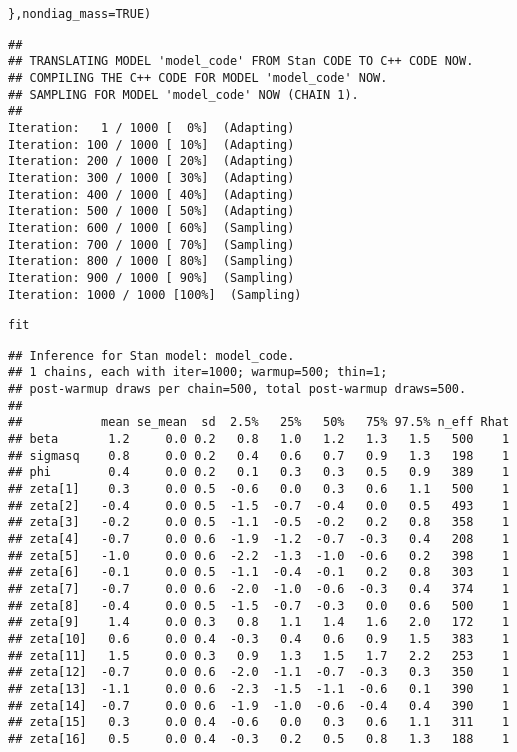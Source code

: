 \documentclass{article}\usepackage[]{graphicx}\usepackage[]{color}
\makeatletter
\newcommand{\hlnum}[1]{\textcolor[rgb]{0.686,0.059,0.569}{#1}}%
\newcommand{\hlstd}[1]{\textcolor[rgb]{0.345,0.345,0.345}{#1}}%
\newcommand{\hlkwc}[1]{\textcolor[rgb]{0.333,0.667,0.333}{#1}}%
\newenvironment{kframe}{%
 \def\at@end@of@kframe{}%
 \ifinner\ifhmode%
  \def\at@end@of@kframe{\end{minipage}}%
  \begin{minipage}{\columnwidth}%
 \fi\fi%
 \def\FrameCommand##1{\hskip\@totalleftmargin \hskip-\fboxsep
 \colorbox{shadecolor}{##1}\hskip-\fboxsep
     \hskip-\linewidth \hskip-\@totalleftmargin \hskip\columnwidth}%
 \MakeFramed {\advance\hsize-\width
   \@totalleftmargin\z@ \linewidth\hsize
   \@setminipage}}%
 {\par\unskip\endMakeFramed%
 \at@end@of@kframe}
\newenvironment{knitrout}{}{} %
\makeatother
\begin{document}
\begin{knitrout}
\begin{kframe}
\begin{alltt}
    \hlstd{\},} \hlkwc{nondiag_mass} \hlstd{=} \hlnum{TRUE}\hlstd{)}
\end{alltt}
\begin{verbatim}
## 
## TRANSLATING MODEL 'model_code' FROM Stan CODE TO C++ CODE NOW.
## COMPILING THE C++ CODE FOR MODEL 'model_code' NOW.
## SAMPLING FOR MODEL 'model_code' NOW (CHAIN 1).
## 
Iteration:   1 / 1000 [  0%]  (Adapting)
Iteration: 100 / 1000 [ 10%]  (Adapting)
Iteration: 200 / 1000 [ 20%]  (Adapting)
Iteration: 300 / 1000 [ 30%]  (Adapting)
Iteration: 400 / 1000 [ 40%]  (Adapting)
Iteration: 500 / 1000 [ 50%]  (Adapting)
Iteration: 600 / 1000 [ 60%]  (Sampling)
Iteration: 700 / 1000 [ 70%]  (Sampling)
Iteration: 800 / 1000 [ 80%]  (Sampling)
Iteration: 900 / 1000 [ 90%]  (Sampling)
Iteration: 1000 / 1000 [100%]  (Sampling)
\end{verbatim}
\begin{alltt}
\hlstd{fit}
\end{alltt}
\begin{verbatim}
## Inference for Stan model: model_code.
## 1 chains, each with iter=1000; warmup=500; thin=1; 
## post-warmup draws per chain=500, total post-warmup draws=500.
## 
##           mean se_mean  sd  2.5%   25%   50%   75% 97.5% n_eff Rhat
## beta       1.2     0.0 0.2   0.8   1.0   1.2   1.3   1.5   500    1
## sigmasq    0.8     0.0 0.2   0.4   0.6   0.7   0.9   1.3   198    1
## phi        0.4     0.0 0.2   0.1   0.3   0.3   0.5   0.9   389    1
## zeta[1]    0.3     0.0 0.5  -0.6   0.0   0.3   0.6   1.1   500    1
## zeta[2]   -0.4     0.0 0.5  -1.5  -0.7  -0.4   0.0   0.5   493    1
## zeta[3]   -0.2     0.0 0.5  -1.1  -0.5  -0.2   0.2   0.8   358    1
## zeta[4]   -0.7     0.0 0.6  -1.9  -1.2  -0.7  -0.3   0.4   208    1
## zeta[5]   -1.0     0.0 0.6  -2.2  -1.3  -1.0  -0.6   0.2   398    1
## zeta[6]   -0.1     0.0 0.5  -1.1  -0.4  -0.1   0.2   0.8   303    1
## zeta[7]   -0.7     0.0 0.6  -2.0  -1.0  -0.6  -0.3   0.4   374    1
## zeta[8]   -0.4     0.0 0.5  -1.5  -0.7  -0.3   0.0   0.6   500    1
## zeta[9]    1.4     0.0 0.3   0.8   1.1   1.4   1.6   2.0   172    1
## zeta[10]   0.6     0.0 0.4  -0.3   0.4   0.6   0.9   1.5   383    1
## zeta[11]   1.5     0.0 0.3   0.9   1.3   1.5   1.7   2.2   253    1
## zeta[12]  -0.7     0.0 0.6  -2.0  -1.1  -0.7  -0.3   0.3   350    1
## zeta[13]  -1.1     0.0 0.6  -2.3  -1.5  -1.1  -0.6   0.1   390    1
## zeta[14]  -0.7     0.0 0.6  -1.9  -1.0  -0.6  -0.4   0.4   390    1
## zeta[15]   0.3     0.0 0.4  -0.6   0.0   0.3   0.6   1.1   311    1
## zeta[16]   0.5     0.0 0.4  -0.3   0.2   0.5   0.8   1.3   188    1

\end{verbatim}
\end{kframe}
\end{knitrout}
\end{document}
